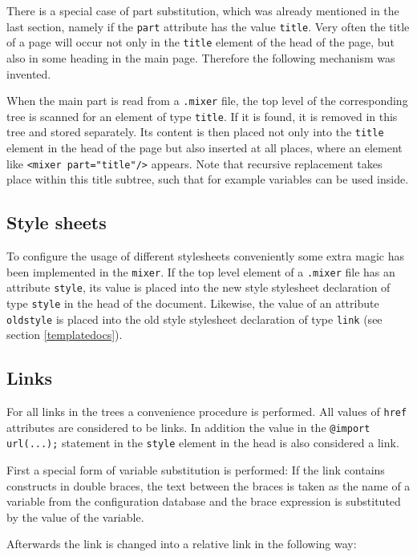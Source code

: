 \documentclass[a4paper,11pt]{article}
\newcommand{\mixer}{\texttt{mixer}}
\begin{document}
There is a special case of part substitution, which was already mentioned 
in the last section, namely if the \verb!part! attribute has the value
\verb!title!. Very often the title of a page will occur not only in
the \verb!title! element of the head of the page, but also in some
heading in the main page. Therefore the following mechanism was invented.

When the main part is read from a \verb!.mixer! file, the top level of
the corresponding tree is scanned for an element of type \verb!title!.
If it is found, it is removed in this tree and stored separately.
Its content is then placed not only into the \verb!title! element
in the head of the page but also inserted at all places, where an
element like \verb!<mixer part="title"/>! appears. Note that
recursive replacement takes place within this title subtree, such
that for example variables can be used inside.


\subsection{Style sheets}

To configure the usage of different stylesheets conveniently some extra
magic has been implemented in the \mixer. If the top level element
of a \verb!.mixer! file has an attribute \verb!style!, its value is
placed into the new style stylesheet declaration of type \verb!style!
in the head of the document. Likewise, the value of an attribute
\verb!oldstyle! is placed into the old style stylesheet declaration of
type \verb!link! (see section \ref{templatedocs}).

\subsection{Links}
\label{links}

For all links in the trees a convenience procedure is performed. All
values of \verb!href! attributes are considered to be links. In addition
the value in the \verb!@import url(...);! statement in the
\verb!style! element in the head is also considered a link.

First a special form of variable substitution is performed: If the link
contains constructs in double braces, the text between the braces is
taken as the name of a variable from the configuration database 
and the brace expression is substituted by the value of the variable.

Afterwards the link is changed into a relative link in the following way:
\end{document}
